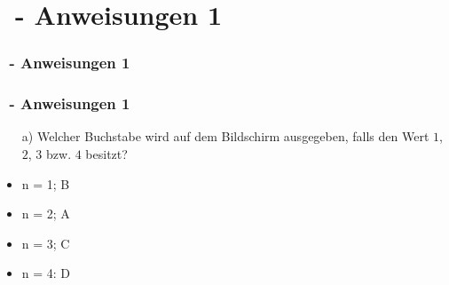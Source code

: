 \def\stitle{\theexercise\ - Anweisungen 1}
\section{\stitle}
\begin{frame}
    \frametitle{\stitle}
\tableofcontents[current]    
\end{frame}


\begin{frame}[t]%
    \frametitle{\stitle}

\begin{itemize}
\item[a)] Welcher Buchstabe wird auf dem Bildschirm ausgegeben, falls  den Wert $1$, $2$, $3$ bzw. $4$ besitzt?
\end{itemize}

\pause

\begin{center}
\begin{minipage}{0.4\textwidth}
\begin{itemize}
\item n = 1; B
\item n = 2; A
\end{itemize}
\end{minipage}
\begin{minipage}{0.5\textwidth}
\begin{itemize}
\item n = 3; C
\item n = 4: D
\end{itemize}
\end{minipage}
\end{center}

\end{frame}


